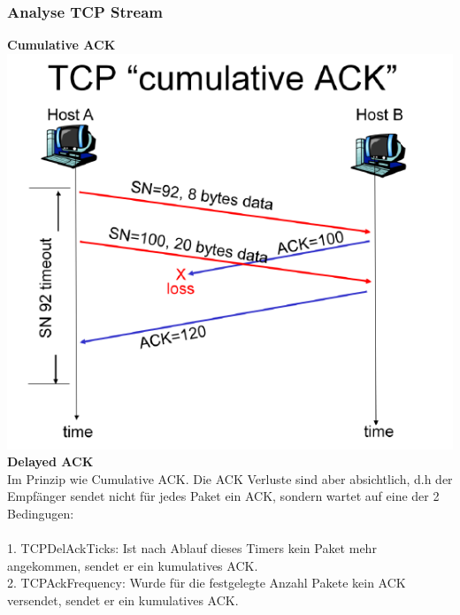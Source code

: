 \subsubsection{Analyse TCP Stream}
\textbf{Cumulative ACK}\\
\includegraphics[scale=0.5]{media/cumulativeACK.png}\\
\textbf{Delayed ACK}\\
Im Prinzip wie Cumulative ACK. Die ACK Verluste sind aber absichtlich, d.h der Empfänger sendet nicht für jedes Paket ein ACK, sondern wartet auf eine der 2 Bedingugen:\\\\
1. TCPDelAckTicks: Ist nach Ablauf dieses Timers kein Paket mehr angekommen, sendet er ein kumulatives ACK. \\
2. TCPAckFrequency: Wurde für die festgelegte Anzahl Pakete kein ACK versendet, sendet er ein kumulatives ACK.\\

